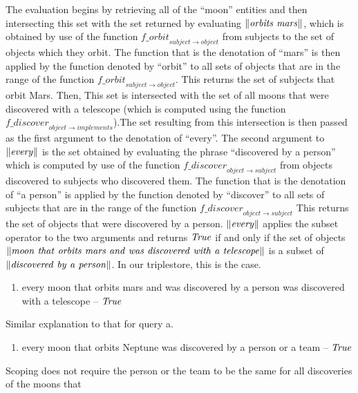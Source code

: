 \documentclass[../main.tex]{subfiles}
\begin{document}
\begin{refsection}
The evaluation begins by retrieving all of the ``moon'' entities and then
intersecting this set with the set returned by evaluating $\lVert \mathit{orbits\ mars} \rVert$, which is obtained by use of the
function $\mathit{f\_orbit}_{\mathit{subject} \rightarrow \mathit{object}}$ from subjects to the set of objects which they orbit. The function that is the
denotation of ``mars'' is then applied by the function denoted by ``orbit'' to all sets of objects that are in
the range of the function $\mathit{f\_orbit}_{\mathit{subject} \rightarrow \mathit{object}}$. This returns the set of subjects that orbit Mars. Then, This set is
intersected with the set of all moons that were discovered with a telescope (which is computed using
the function $\mathit{f\_discover}_{\mathit{object} \rightarrow \mathit{implements}}$).The set resulting from this intersection is then passed as the first
argument to the denotation of ``every''. The second argument to $\lVert \mathit{\mathit{every}} \rVert$ is the set obtained by
evaluating the phrase ``discovered by a person'' which is computed by use of the function $\mathit{f\_discover}_{\mathit{object} \rightarrow \mathit{subject}}$ from objects discovered to subjects who discovered them. The function that is the denotation of ``a
person'' is applied by the function denoted by ``discover'' to all sets of subjects that are in the range of
the function $\mathit{f\_discover}_{\mathit{object} \rightarrow \mathit{subject}}$ This returns the set of objects that were discovered by a person.
$\lVert \mathit{every} \rVert$ applies the subset operator to the two arguments and returns $\mathit{True}$ if and only if the set of objects
$\meaningof{moon\ that\ orbits\ mars\ and\ was\ discovered\ with\ a\ telescope}$ is a subset of $\lVert \mathit{discovered\ by\ a\ person} \rVert$. In
our triplestore, this is the case.
\begin{enumerate}[before=\small, label=\alph*.]
	\setlength\itemsep{0em}
	\setcounter{enumi}{1}
	\item every moon that orbits mars and was discovered  by a person was discovered with a telescope – $\mathit{True}$
\end{enumerate}
\noindent Similar explanation to that for query a.
\begin{enumerate}[before=\small, label=\alph*.]
	\setlength\itemsep{0em}
	\setcounter{enumi}{2}
	\item every moon that orbits Neptune was discovered by a person or a team – $\mathit{True}$
\end{enumerate}
\noindent Scoping does not require the person or the team to be the same for all discoveries of the moons that

\end{refsection}
\end{document}
